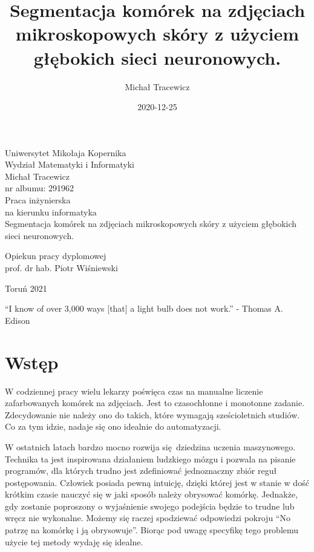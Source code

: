 \documentclass{article}
\title{Segmentacja komórek na zdjęciach mikroskopowych skóry z użyciem głębokich sieci neuronowych.}
\date{2020-12-25}
\author{Michał Tracewicz}
\begin{document}
\begin{titlepage}
    \begin{center}
        {\large Uniwersytet Mikołaja Kopernika\\}
        {\large Wydział Matematyki i Informatyki\\}
        \vspace{2.1cm}
        {\large Michał Tracewicz\\}
        nr albumu: 291962\\
        \vspace{2cm}
        Praca inżynierska\\
        na kierunku informatyka\\
        \vspace{2cm}
        {\huge Segmentacja komórek na zdjęciach mikroskopowych skóry z użyciem głębokich sieci neuronowych.\\}
    \end{center}
    \hfill
    \begin{minipage}{6cm}
        \vspace{12mm}
        {
            Opiekun pracy dyplomowej\\
            prof. dr hab. Piotr Wiśniewski
        }
    \end{minipage}
    \vspace{2cm}
    \begin{center}
        {Toruń 2021\\}
    \end{center}
    \vspace{1.2cm}
\end{titlepage}
\newpage
\tableofcontents
\newpage
\hspace{0pt}
\vfill
{\huge{``I know of over 3,000 ways [that] a light bulb does not work.'' - Thomas A. Edison}}
\vfill
\hspace{0pt}
\newpage
\section{Wstęp}
W codziennej pracy wielu lekarzy poświęca czas na manualne liczenie zafarbowanych komórek na zdjęciach.
Jest to czasochłonne i monotonne zadanie.
Zdecydowanie nie należy ono do takich, które wymagają sześcioletnich studiów.
Co za tym idzie, nadaje się ono idealnie do automatyzacji.

W ostatnich latach bardzo mocno rozwija się dziedzina uczenia maszynowego.
Technika ta jest inspirowana działaniem ludzkiego mózgu i pozwala na pisanie programów, dla których trudno jest zdefiniować jednoznaczny zbiór reguł postępowania.
Człowiek posiada pewną intuicję, dzięki której jest w stanie w dość krótkim czasie nauczyć się w jaki sposób należy obrysować komórkę.
Jednakże, gdy zostanie poproszony o wyjaśnienie swojego podejścia będzie to trudne lub wręcz nie wykonalne.
Możemy się raczej spodziewać odpowiedzi pokroju ``No patrzę na komórkę i ją obrysowuje''.
Biorąc pod uwagę specyfikę tego problemu użycie tej metody wydaję się idealne.
\end{document}
